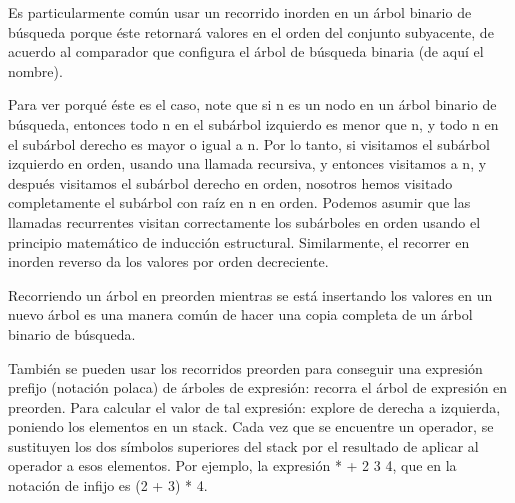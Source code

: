 Es particularmente común usar un recorrido inorden en un árbol binario de búsqueda porque éste retornará valores en el orden del conjunto subyacente, de acuerdo al comparador que configura el árbol de búsqueda binaria (de aquí el nombre).

Para ver porqué éste es el caso, note que si n es un nodo en un árbol binario de búsqueda, entonces todo n en el subárbol izquierdo es menor que n, y todo n en el subárbol derecho es mayor o igual a n. Por lo tanto, si visitamos el subárbol izquierdo en orden, usando una llamada recursiva, y entonces visitamos a n, y después visitamos el subárbol derecho en orden, nosotros hemos visitado completamente el subárbol con raíz en n en orden. Podemos asumir que las llamadas recurrentes visitan correctamente los subárboles en orden usando el principio matemático de inducción estructural. Similarmente, el recorrer en inorden reverso da los valores por orden decreciente. 

Recorriendo un árbol en preorden mientras se está insertando los valores en un nuevo árbol es una manera común de hacer una copia completa de un árbol binario de búsqueda.

También se pueden usar los recorridos preorden para conseguir una expresión prefijo 
(notación polaca) de árboles de expresión: recorra el árbol de expresión en 
preorden. Para calcular el valor de tal expresión: explore de derecha a izquierda, 
poniendo los elementos en un stack. Cada vez que se encuentre un operador, se 
sustituyen los dos símbolos superiores del stack por el resultado de aplicar al 
operador a esos elementos. Por ejemplo, la expresión * + 2 3 4, que en la notación 
de infijo es (2 + 3) * 4.